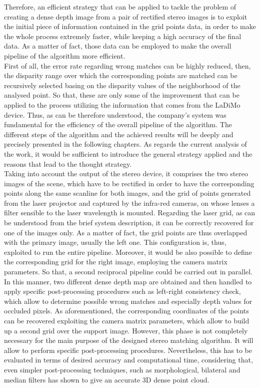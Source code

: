 Therefore, an efficient strategy that can be applied to tackle the problem of creating a dense depth image from a pair of rectified stereo images is to exploit the initial piece of information contained in the grid points data, in order to make the whole process extremely faster, while keeping a high accuracy of the final data.
As a matter of fact, those data can be employed to make the overall pipeline of the algorithm more efficient. \\
First of all, the error rate regarding wrong matches can be highly reduced, then, the disparity range over which the corresponding points are matched can be recursively selected basing on the disparity values of the neighborhood of the analysed point. 
So that, these are only some of the improvement that can be applied to the process utilizing the information that comes from the LaDiMo device.
Thus, as can be therefore understood, the company's system was fundamental for the efficiency of the overall pipeline of the algorithm.
The different steps of the algorithm and the achieved results will be deeply and precisely presented in the following chapters. 
As regards the current analysis of the work, it would be sufficient to introduce the general strategy applied and the reasons that lead to the thought strategy.\\
Taking into account the output of the stereo device, it comprises the two stereo images of the scene, which have to be rectified in order to have the corresponding points along the same scanline for both images, and the grid of points generated from the laser projector and captured by the infra-red cameras, on whose lenses a filter sensible to the laser wavelength is mounted.
Regarding the laser grid, as can be understood from the brief system description, it can be correctly recovered for one of the images only. 
As a matter of fact, the grid points are thus overlapped with the primary image, usually the left one. 
This configuration is, thus, exploited to run the entire pipeline. 
Moreover, it would be also possible to define the corresponding grid for the right image, employing the camera matrix parameters. 
So that, a second reciprocal pipeline could be carried out in parallel. 
In this manner, two different dense depth map are obtained and then handled to apply specific post-processing procedures such as left-right consistency check, which allow to determine possible wrong matches and especially depth values for occluded pixels. 
As aforementioned, the corresponding coordinates of the points can be recovered exploiting the camera matrix parameters, which allow to build up a second grid over the support image. 
However, this phase is not completely necessary for the main purpose of the designed stereo matching algorithm.
It will allow to perform specific post-processing procedures. 
Nevertheless, this has to be evaluated in terms of desired accuracy and computational time, considering that, even simpler post-processing techniques, such as morphological, bilateral and median filters has shown to give an accurate 3D dense point cloud.

